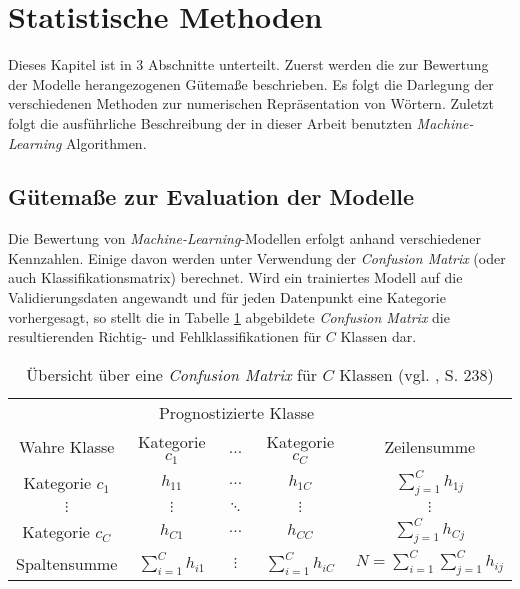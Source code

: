 \documentclass[a4paper,11pt]{article}
\begin{document}
\section{Statistische Methoden}\label{kap:3}

Dieses Kapitel ist in $3$ Abschnitte unterteilt. Zuerst werden die zur Bewertung der Modelle herangezogenen Gütemaße beschrieben. Es folgt die Darlegung der verschiedenen Methoden zur numerischen Repräsentation von Wörtern. Zuletzt folgt die ausführliche Beschreibung der in dieser Arbeit benutzten \textit{Machine-Learning} Algorithmen.

\subsection{Gütemaße zur Evaluation der Modelle}\label{kap:guetemass}

Die Bewertung von \textit{Machine-Learning}-Modellen erfolgt anhand verschiedener Kennzahlen. Einige davon werden unter Verwendung der \textit{Confusion Matrix} (oder auch Klassifikationsmatrix) berechnet. Wird ein trainiertes Modell auf die Validierungsdaten angewandt und für jeden Datenpunkt eine Kategorie vorhergesagt, so stellt die in Tabelle \ref{tab:confusionMatrix} abgebildete \textit{Confusion Matrix} die resultierenden Richtig- und Fehlklassifikationen für $C$ Klassen dar.

\begin{table}[ht]
\begin{center}
\begin{tabular}{|c|ccc|c|}
  \hline
 & \multicolumn{3}{|c|}{Prognostizierte Klasse} &  \\
Wahre Klasse & Kategorie $c_1$ & ...  & Kategorie $c_C$ & Zeilensumme  \\ 
  \hline
Kategorie $c_1$ & $h_{11}$ & $\hdots$ & $h_{1C}$ & $\sum_{j=1}^C h_{1j}$\\
$\vdots$ & $\vdots$ & $\ddots$ & $\vdots$ & $\vdots$ \\
Kategorie $c_C$ & $h_{C1}$ & $\hdots$ & $h_{CC}$ & $\sum_{j=1}^C h_{Cj}$\\
\hline
Spaltensumme & $\sum_{i=1}^C h_{i1}$ & $\vdots$ & $\sum_{i=1}^C h_{iC}$ & 
$N = \sum_{i=1}^C \sum_{j=1}^C h_{ij}$\\
   \hline
\end{tabular}

  \caption{Übersicht über eine \textit{Confusion Matrix}  für $C$  Klassen (vgl. \cite{backhaus}, S. 238)}  
  \label{tab:confusionMatrix}
\end{center}
\end{table}
\end{document}
